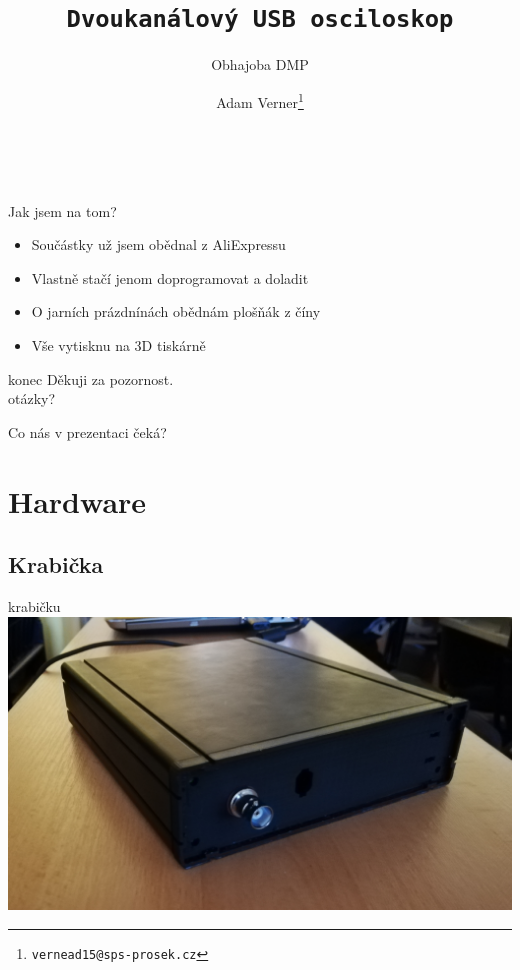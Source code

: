 \documentclass{beamer}
\title{\texttt{\LARGE Dvoukanálový USB osciloskop}}
\subtitle{ Obhajoba DMP }
\author{ Adam Verner\footnote{\texttt{vernead15@sps-prosek.cz}}}
\begin{document}
\begin{frame}
  \maketitle \\
\end{frame}


\begin{frame}{Jak jsem na tom?}
	\begin{itemize}
		\item Součástky už jsem obědnal z AliExpressu
		\item Vlastně stačí jenom doprogramovat a doladit
		\item O jarních prázdnínách obědnám plošňák z číny
		\item Vše vytisknu na 3D tiskárně
	\end{itemize}
\end{frame}


\begin{frame}{konec}
	\Huge Děkuji za pozornost. \\[.35cm]
	\normalsize otázky?
\end{frame}

\begin{frame}{Co nás v prezentaci čeká?}
  \tableofcontents
\end{frame}
	
\section{Hardware}

	\subsection{Krabička}
	\begin{frame}{krabičku}
		\centering
		\includegraphics[width=\linewidth]{outer_profile.jpg}
	\end{frame}		
	
\end{document}
